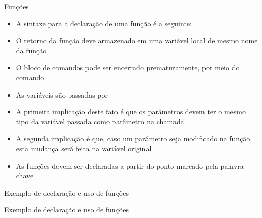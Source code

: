 \begin{frame}[fragile]{Funções}

    \begin{itemize}
        \item A sintaxe para a declaração de uma função é a seguinte:


        \item O retorno da função deve armazenado em uma variável local de mesmo nome da função

        \item O bloco de comandos pode ser encerrado prematuramente, por meio do comando

        \item As variáveis são passadas por 

        \item A primeira implicação deste fato é que os parâmetros devem ter o mesmo tipo da
            variável passada como parâmetro na chamada

        \item A segunda implicação é que, caso um parâmetro seja modificado na função, esta
            mudança será feita na variável original

        \item As funções devem ser declaradas a partir do ponto marcado pela palavra-chave
    \end{itemize}

\end{frame}

\begin{frame}[fragile]{Exemplo de declaração e uso de funções}
\end{frame}

\begin{frame}[fragile]{Exemplo de declaração e uso de funções}
\end{frame}

